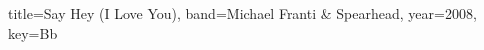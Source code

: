 \documentclass{skrul-leadsheet}
\begin{document}
\begin{song}[transpose-capo=true]{title={Say Hey (I Love You)}, band={Michael Franti \& Spearhead}, year={2008}, key={Bb}}



\end{song}
\end{document}
